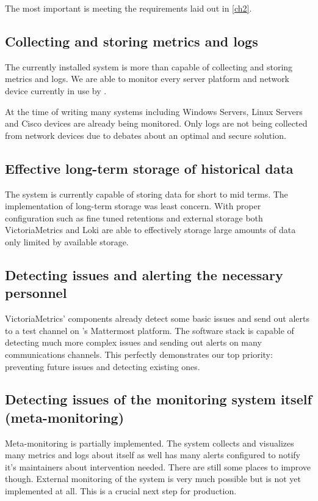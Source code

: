 The most important is meeting the requirements laid out in \autoref{ch2}.

\subsection{Collecting and storing metrics and logs}

The currently installed system is more than capable of collecting and storing
metrics and logs. We are able to monitor every server platform and network
device currently in use by \kszk.

At the time of writing many systems including Windows Servers, Linux Servers
and Cisco devices are already being monitored. Only logs are not being
collected from network devices due to debates about an optimal and secure
solution.

\subsection{Effective long-term storage of historical data}

The system is currently capable of storing data for short to mid terms. The
implementation of long-term storage was least concern. With proper
configuration such as fine tuned retentions and external storage both
VictoriaMetrics and Loki are able to effectively storage large amounts of data
only limited by available storage.

\subsection{Detecting issues and alerting the necessary personnel}

VictoriaMetrics' components already detect some basic issues and send out
alerts to a test channel on \kszk's Mattermost platform. The software stack is
capable of detecting much more complex issues and sending out alerts on many
communications channels. This perfectly demonstrates our top priority:
preventing future issues and detecting existing ones.

\subsection{Detecting issues of the monitoring system itself (meta-monitoring)}

Meta-monitoring is partially implemented. The system collects and visualizes
many metrics and logs about itself as well has many alerts configured to notify
it's maintainers about intervention needed. There are still some places to
improve though. External monitoring of the system is very much possible but is
not yet implemented at all. This is a crucial next step for production.

